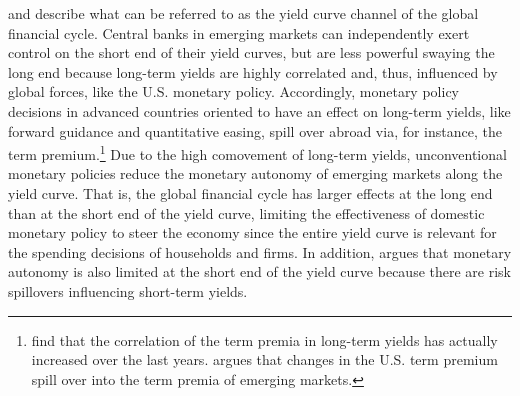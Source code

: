 {%
\cite{Obstfeld:2015} and \cite{KolasaWesolowski:2020} describe what can be referred to as the yield curve channel of the global financial cycle.
Central banks in emerging markets can independently exert control on the short end of their yield curves, but are less powerful swaying the long end 
because long-term yields are highly correlated and, thus, influenced by global forces, like the U.S. monetary policy.
Accordingly, monetary policy decisions in advanced countries oriented to have an effect on long-term yields, like forward guidance and quantitative easing, spill over abroad via, for instance, the term premium.\footnote{ \cite{ACDM:2019} find that the correlation of the term premia in long-term yields has actually increased over the last years. \cite{Turner:2014} argues that changes in the U.S. term premium spill over into the term premia of emerging markets.}
Due to the high comovement of long-term yields, unconventional monetary policies
reduce the monetary autonomy of emerging markets 
along the yield curve.
That is, the global financial cycle has larger effects at the long end than at the short end of the yield curve, limiting the effectiveness of domestic monetary policy to steer the economy since the entire yield curve is relevant for the spending decisions of households and firms.
In addition, \cite{Kalemli-Ozcan:2019} argues that monetary autonomy is also limited at the short end of the yield curve because there are risk spillovers influencing 
short-term yields.

}

